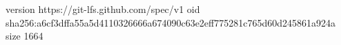 version https://git-lfs.github.com/spec/v1
oid sha256:a6cf3dffa55a5d4110326666a674090c63e2eff775281c765d60d245861a924a
size 1664
